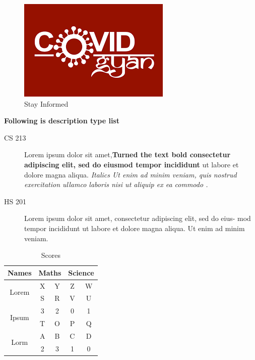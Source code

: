 \documentclass{article}
\begin{document}
\begin{figure}
\centering
\includegraphics[scale=0.3]{cov.png}
\caption{Stay Informed}
\end{figure}
\textbf{Following is description type list}
\begin{description}
\item[CS 213]Lorem ipsum dolor sit amet,\textbf{Turned the text bold consectetur adipiscing elit, sed do eiusmod tempor incididunt} ut labore et dolore magna aliqua. \textit{Italics Ut enim ad minim veniam, quis nostrud exercitation ullamco laboris nisi ut aliquip ex ea commodo .}
\item[HS 201]Lorem ipsum dolor sit amet, consectetur adipiscing elit, sed do eius- mod tempor incididunt ut labore et dolore magna aliqua. Ut enim ad minim veniam.
\end{description}
\newpage
\pagecolor{green}
\begin{table}[ht]
\centering
\begin{tabular}{|c|c|c|c|c|}
\hline
Names&\multicolumn{2}{|c|}{Maths}&\multicolumn{2}{|c|}{Science}\\
\hline
\multirow{2}{*}{Lorem}&X&Y&Z&W\\\cline{2-5}
&S&R&V&U\\\hline
\multirow{2}{*}{Ipsum}&3&2&0&1\\\cline{2-5}
&T&O&P&Q\\\hline
\multirow{2}{*}{Lorm}&A&B&C&D\\\cline{2-5}
&2&3&1&0\\\hline
\end{tabular}
\caption{Scores}
\end{table}
\end{document}
